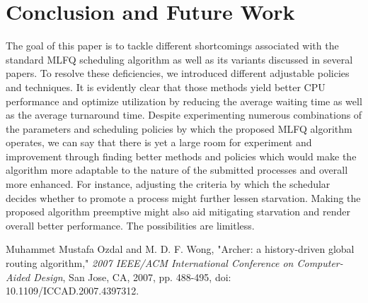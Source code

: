 \documentclass[conference]{IEEEtran}
\begin{document}

\section{Conclusion and Future Work}

The goal of this paper is to tackle different shortcomings associated with the standard MLFQ scheduling algorithm as well as its variants discussed in several papers. To resolve these deficiencies, we introduced different adjustable policies and techniques. It is evidently clear that those methods yield better CPU performance and optimize utilization by reducing the average waiting time as well as the average turnaround time. Despite experimenting numerous combinations of the parameters and scheduling policies by which the proposed MLFQ algorithm operates, we can say that there is yet a large room for experiment and improvement through finding better methods and policies which would make the algorithm more adaptable to the nature of the submitted processes and overall more enhanced. For instance, adjusting the criteria by which the schedular decides whether to promote a process might further lessen starvation. Making the proposed algorithm preemptive might also aid mitigating starvation and render overall better performance. The possibilities are limitless.


\begin{thebibliography}{00}

 Muhammet Mustafa Ozdal and M. D. F. Wong, "Archer: a history-driven global routing algorithm," \textit{2007 IEEE/ACM International Conference on Computer-Aided Design}, San Jose, CA, 2007, pp. 488-495, doi: 10.1109/ICCAD.2007.4397312.



\end{thebibliography}
\end{document}
